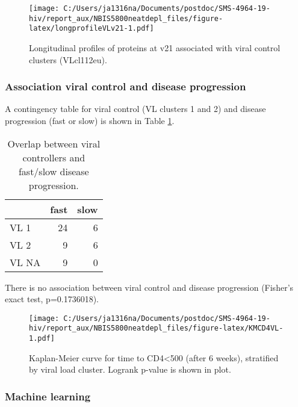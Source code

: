 \documentclass[
]{article}
\begin{document}
\begin{figure}
\centering
\texttt{[image: C:/Users/ja1316na/Documents/postdoc/SMS-4964-19-hiv/report\_aux/NBIS5800neatdepl\_files/figure-latex/longprofileVLv21-1.pdf]}
\caption{\label{fig:longprofileVLv21}Longitudinal profiles of proteins at v21 associated with viral control clusters (VLcl112eu).}
\end{figure}

\FloatBarrier

\hypertarget{association-viral-control-and-disease-progression}{%
\subsubsection{Association viral control and disease progression}\label{association-viral-control-and-disease-progression}}

A contingency table for viral control (VL clusters 1 and 2) and disease progression (fast or slow) is shown in Table \ref{tab:CD4VL}.

\begin{table}

\caption{\label{tab:CD4VL}Overlap between viral controllers and fast/slow disease progression.}
\centering
\begin{tabular}[t]{l|r|r}
\hline
  & fast & slow\\
\hline
VL 1 & 24 & 6\\
\hline
VL 2 & 9 & 6\\
\hline
VL NA & 9 & 0\\
\hline
\end{tabular}
\end{table}

There is no association between viral control and disease progression (Fisher's exact test, p=0.1736018).

\begin{figure}
\centering
\texttt{[image: C:/Users/ja1316na/Documents/postdoc/SMS-4964-19-hiv/report\_aux/NBIS5800neatdepl\_files/figure-latex/KMCD4VL-1.pdf]}
\caption{\label{fig:KMCD4VL}Kaplan-Meier curve for time to CD4\textless500 (after 6 weeks), stratified by viral load cluster. Logrank p-value is shown in plot.}
\end{figure}

\FloatBarrier

\hypertarget{machine-learning}{%
\subsubsection{Machine learning}\label{machine-learning}}
\end{document}
